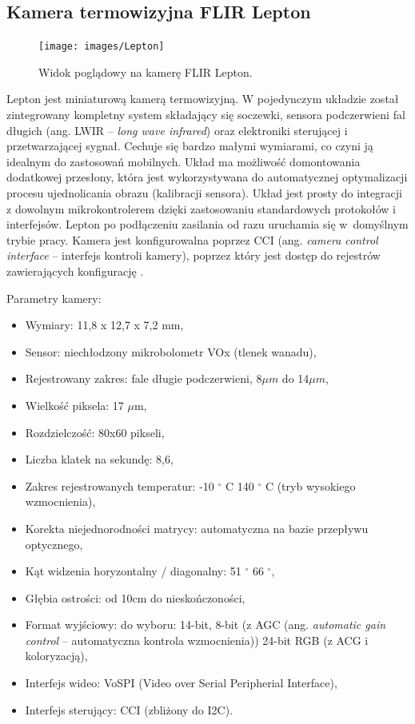 
\subsection{Kamera termowizyjna FLIR Lepton}
\begin{figure}[h]
    \centering
    \texttt{[image: images/Lepton]}
    \caption{Widok poglądowy na kamerę FLIR Lepton.}
    \label{fig:lepton}
\end{figure}
 
Lepton jest miniaturową kamerą termowizyjną. W pojedynczym układzie został zintegrowany kompletny system składający się soczewki, sensora podczerwieni fal długich (ang. LWIR -- \textit{long wave infrared}) oraz elektroniki sterującej i przetwarzającej sygnał.
Cechuje się bardzo małymi wymiarami, co czyni ją idealnym do zastosowań mobilnych. 
Układ ma możliwość domontowania dodatkowej przesłony, która jest wykorzystywana do automatycznej optymalizacji procesu ujednolicania obrazu (kalibracji sensora).
Układ jest prosty do integracji z dowolnym mikrokontrolerem dzięki zastosowaniu standardowych protokołów i interfejsów. %
Lepton po podłączeniu zasilania od razu uruchamia się w~domyślnym trybie pracy. Kamera jest konfigurowalna poprzez CCI (ang. \textit{camera control interface} – interfejs kontroli kamery), poprzez który jest dostęp do rejestrów zawierających konfigurację \cite{lepton}. %

Parametry kamery:
\begin{itemize}
\item Wymiary: 11,8 x 12,7 x 7,2 mm, 
\item Sensor: niechłodzony mikrobolometr VOx (tlenek wanadu),
\item Rejestrowany zakres: fale długie podczerwieni, 8$\mu m$ do 14$\mu m$,
\item Wielkość piksela: 17 $\mu$m,
\item Rozdzielczość: 80x60 pikseli,
\item Liczba klatek na sekundę: 8,6,  %
\item Zakres rejestrowanych temperatur: -10  $^\circ$  C 140  $^\circ$  C (tryb wysokiego wzmocnienia),
\item Korekta niejednorodności matrycy: automatyczna na bazie przepływu optycznego, %
\item Kąt widzenia horyzontalny / diagonalny: 51 $^\circ$  66 $^\circ$,
\item Głębia ostrości: od 10cm do nieskończoności,
\item Format wyjściowy: do wyboru: 14-bit, 8-bit (z AGC (ang. \textit{automatic gain control} -- automatyczna kontrola wzmocnienia)) 24-bit RGB (z ACG i koloryzacją),
\item Interfejs wideo: VoSPI (Video over Serial Peripherial Interface),
\item Interfejs sterujący: CCI (zbliżony do I2C).
\end{itemize}

